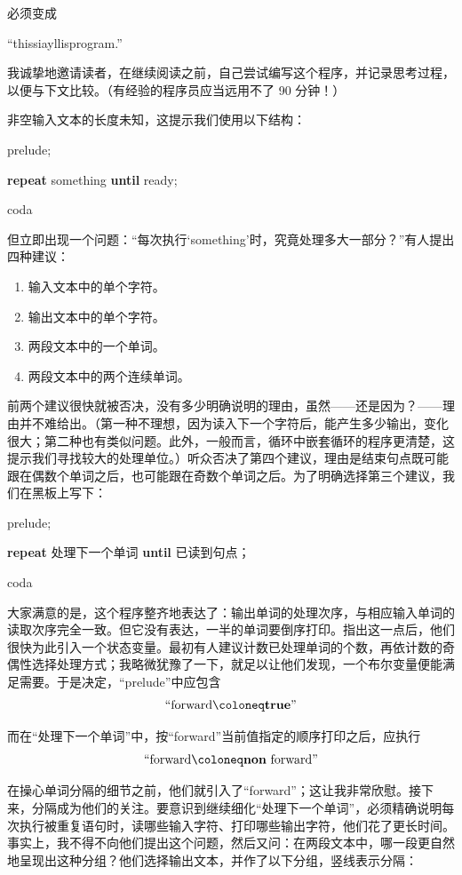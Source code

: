 \documentclass[twoside,11pt,fontset=none]{ctexbook}
\begin{document}
\noindent
必须变成

\quad ``this\textendash si\textendash a\textendash yllis\textendash program.''

我诚挚地邀请读者，在继续阅读之前，自己尝试编写这个程序，并记录思考过程，以便与下文比较。（有经验的程序员应当远用不了 90 分钟！）

非空输入文本的长度未知，这提示我们使用以下结构：

\quad prelude;

\quad \textbf{repeat} something \textbf{until} ready;

\quad coda

\noindent
但立即出现一个问题：“每次执行‘something’时，究竟处理多大一部分？”有人提出四种建议：

\begin{enumerate}[wide, nosep, label=(\arabic*)]
	\item 输入文本中的单个字符。
	\item 输出文本中的单个字符。
	\item 两段文本中的一个单词。
	\item 两段文本中的两个连续单词。
\end{enumerate}

前两个建议很快就被否决，没有多少明确说明的理由，虽然——还是因为？——理由并不难给出。（第一种不理想，因为读入下一个字符后，能产生多少输出，变化很大；第二种也有类似问题。此外，一般而言，循环中嵌套循环的程序更清楚，这提示我们寻找较大的处理单位。）听众否决了第四个建议，理由是结束句点既可能跟在偶数个单词之后，也可能跟在奇数个单词之后。为了明确选择第三个建议，我们在黑板上写下：

\quad prelude;

\quad \textbf{repeat} 处理下一个单词 \textbf{until} 已读到句点；

\quad coda

大家满意的是，这个程序整齐地表达了：输出单词的处理次序，与相应输入单词的读取次序完全一致。但它没有表达，一半的单词要倒序打印。指出这一点后，他们很快为此引入一个状态变量。最初有人建议计数已处理单词的个数，再依计数的奇偶性选择处理方式；我略微犹豫了一下，就足以让他们发现，一个布尔变量便能满足需要。于是决定，“prelude”中应包含
$$
\text{``forward} \coloneq \text{\textbf{true}''}
$$

\noindent
而在“处理下一个单词”中，按“forward”当前值指定的顺序打印之后，应执行
$$
\text{``forward} \coloneq \text{\textbf{non} forward''}
$$

在操心单词分隔的细节之前，他们就引入了“forward”；这让我非常欣慰。接下来，分隔成为他们的关注。要意识到继续细化“处理下一个单词”，必须精确说明每次执行被重复语句时，读哪些输入字符、打印哪些输出字符，他们花了更长时间。事实上，我不得不向他们提出这个问题，然后又问：在两段文本中，哪一段更自然地呈现出这种分组？他们选择输出文本，并作了以下分组，竖线表示分隔：
\end{document}
